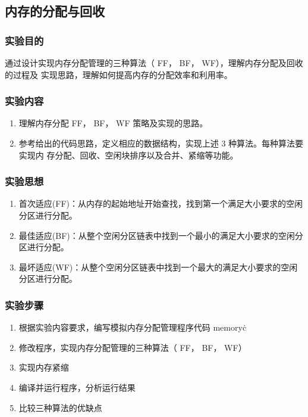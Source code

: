 \documentclass{article}
\begin{document}
    \subsection{内存的分配与回收}
    \subsubsection{实验目的}
    通过设计实现内存分配管理的三种算法（ FF， BF， WF），理解内存分配及回收的过程及
    实现思路，理解如何提高内存的分配效率和利用率。
    \subsubsection{实验内容}
    
    \begin{enumerate}
        \item 理解内存分配 FF， BF， WF 策略及实现的思路。
        \item 参考给出的代码思路，定义相应的数据结构，实现上述 3 种算法。每种算法要实现内
        存分配、回收、空闲块排序以及合并、紧缩等功能。
    \end{enumerate}

    \subsubsection{实验思想}

    \begin{enumerate}
        \item 首次适应(FF)：从内存的起始地址开始查找，找到第一个满足大小要求的空闲分区进行分配。
        \item 最佳适应(BF)：从整个空闲分区链表中找到一个最小的满足大小要求的空闲分区进行分配。
        \item 最坏适应(WF)：从整个空闲分区链表中找到一个最大的满足大小要求的空闲分区进行分配。
    \end{enumerate}

    \subsubsection{实验步骤}

    \begin{enumerate}
        \item 根据实验内容要求，编写模拟内存分配管理程序代码 memory\.c
        \item 修改程序，实现内存分配管理的三种算法（ FF， BF， WF）
        \item 实现内存紧缩
        \item 编译并运行程序，分析运行结果
        \item 比较三种算法的优缺点
    \end{enumerate}
\end{document}
